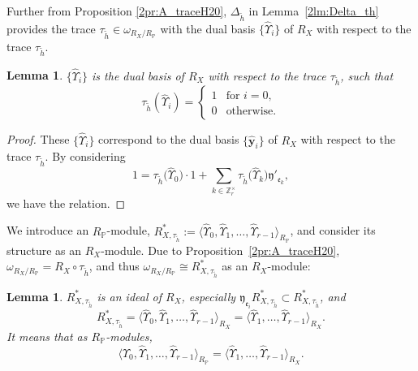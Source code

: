 \documentclass[10pt,a4paper]{amsart}
\def\ZZ{{\mathbb Z}}
\def\PP{{\mathbb P}}
\def\fe{{\mathfrak e}}
\def\fy{{\mathfrak y}}
\def\th{{\widetilde h}}
\def\hby{\widehat {{\mathbf y}}}
\def\hUpsilon{{\widehat \Upsilon}}
\numberwithin{equation}{section}
\newtheorem{Lemma}[Theorem]{Lemma}
\begin{document}
Further from Proposition \ref{2pr:A_traceH20}, $\Delta_{\th}$ in Lemma~\ref{2lm:Delta_th} provides the trace $\tau_\th\in \omega_{R_X/R_\PP}$ with the dual basis $\big\{\hUpsilon_{i}\big\}$ of $R_X$ with respect to the trace $\tau_\th$.

\begin{Lemma}\label{2lm:tau_th_hUpsiolon}
$\big\{\hUpsilon_{i}\big\}$ is the dual basis of $R_X$ with respect to the trace $\tau_\th$, such that
\[
\tau_\th(\hUpsilon_{i}) =
\begin{cases}
1 & \text{for } i=0,\\
0 & \text{otherwise}.
\end{cases}
\]
\end{Lemma}

\begin{proof}These $\big\{\hUpsilon_{i}\big\}$ correspond to the dual basis $\{\hby_i\}$ of $R_X$ with respect to the trace $\tau_\th$. By considering
\[
1= \tau_\th\big(\hUpsilon_{0}\big) \cdot 1
+\sum_{k\in \ZZ_r^\times}
 \tau_\th\big(\hUpsilon_{k}\big) \fy'_{\fe_k},
\]
we have the relation.
\end{proof}

We introduce an $R_\PP$-module,
$R_{X,\tau_\th}^*:=\big\langle\hUpsilon_{0}, \hUpsilon_{1}, \dots, \hUpsilon_{r-1} \big\rangle_{R_\PP}$,
and consider its structure as an $R_X$-module.
Due to Proposition~\ref{2pr:A_traceH20}, $\omega_{R_X/R_\PP}=R_X\circ \tau_\th$, and thus $\omega_{R_X/R_\PP}\cong R_{X,\tau_\th}^*$ as an $R_X$-module:

\begin{Lemma}\label{2lm:ideal_hUpsilon}
$R_{X,\tau_\th}^*$ is an ideal of $R_X$, especially
 $\fy_{\fe_i} R_{X,\tau_\th}^* \subset R_{X,\tau_\th}^*$, and
\[
R_{X,\tau_\th}^*=
\big\langle \hUpsilon_{0}, \hUpsilon_{1}, \dots, \hUpsilon_{r-1}\big\rangle_{R_X}=
\big\langle \hUpsilon_{1}, \dots, \hUpsilon_{r-1}\big\rangle_{R_X}.
\]
It means that as $R_\PP$-modules,
\[
\big\langle \hUpsilon_{0}, \hUpsilon_{1}, \dots, \hUpsilon_{r-1}\big\rangle_{R_\PP}=
\big\langle \hUpsilon_{1}, \dots, \hUpsilon_{r-1}\big\rangle_{R_X}.
\]
\end{Lemma}
\end{document}
